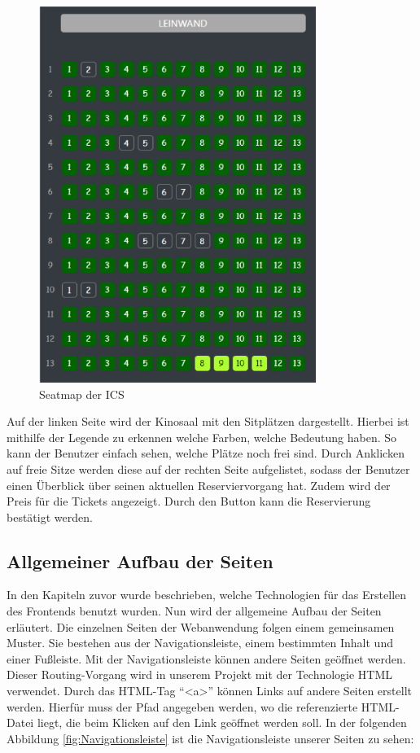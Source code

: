 	     \begin{figure}[H]
	    	    			\centering 
	    	    			\includegraphics[width=9cm]{img/sitzplan.png}
	    	    			\captionsetup{format=hang}
	    	    			\caption[Seatmap der ICS]{\label{fig:Seatmap} Seatmap der \ac{ICS}} 
	    	    \end{figure}
	    
	    Auf der linken Seite wird der Kinosaal mit den Sitplätzen dargestellt. Hierbei ist mithilfe der Legende zu erkennen welche Farben, welche Bedeutung haben. So kann der Benutzer einfach sehen, welche Plätze noch frei sind. Durch Anklicken auf freie Sitze werden diese auf der rechten Seite aufgelistet, sodass der Benutzer einen Überblick über seinen aktuellen Reserviervorgang hat. Zudem wird der Preis für die Tickets angezeigt. Durch den Button kann die Reservierung bestätigt werden.   
	    
	    
	    \subsection{Allgemeiner Aufbau der Seiten}
	    In den Kapiteln zuvor wurde beschrieben, welche Technologien für das Erstellen des Frontends benutzt wurden. Nun wird der allgemeine Aufbau der Seiten erläutert. Die einzelnen Seiten der Webanwendung folgen einem gemeinsamen Muster. Sie bestehen aus der Navigationsleiste, einem bestimmten Inhalt und einer Fußleiste. Mit der Navigationsleiste können andere Seiten geöffnet werden. Dieser Routing-Vorgang wird in unserem Projekt mit der Technologie HTML verwendet. Durch das HTML-Tag \enquote{<a>} können Links auf andere Seiten erstellt werden. Hierfür muss der Pfad angegeben werden, wo die referenzierte HTML-Datei liegt, die beim Klicken auf den Link geöffnet werden soll. In der folgenden Abbildung \ref{fig:Navigationsleiste} ist die Navigationsleiste unserer Seiten zu sehen:
	

